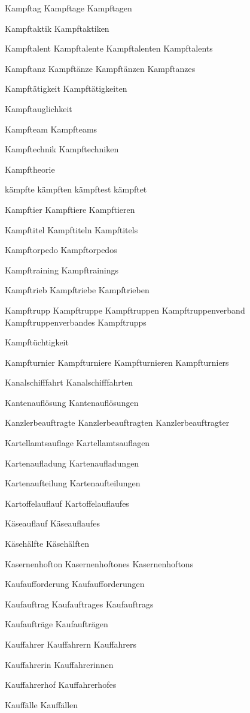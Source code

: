 Kampftag
Kampftage
Kampftagen

Kampftaktik
Kampftaktiken

Kampftalent
Kampftalente
Kampftalenten
Kampftalents

Kampftanz
Kampftänze
Kampftänzen
Kampftanzes

Kampftätigkeit
Kampftätigkeiten

Kampftauglichkeit


Kampfteam
Kampfteams

Kampftechnik
Kampftechniken

Kampftheorie

kämpfte
kämpften
kämpftest
kämpftet

Kampftier
Kampftiere
Kampftieren

Kampftitel
Kampftiteln
Kampftitels

Kampftorpedo
Kampftorpedos

Kampftraining
Kampftrainings

Kampftrieb
Kampftriebe
Kampftrieben

Kampftrupp
Kampftruppe
Kampftruppen
Kampftruppenverband
Kampftruppenverbandes
Kampftrupps

Kampftüchtigkeit

Kampfturnier
Kampfturniere
Kampfturnieren
Kampfturniers

Kanalschifffahrt
Kanalschifffahrten

Kantenauflösung
Kantenauflösungen

Kanzlerbeauftragte
Kanzlerbeauftragten
Kanzlerbeauftragter

Kartellamtsauflage
Kartellamtsauflagen

Kartenaufladung
Kartenaufladungen

Kartenaufteilung
Kartenaufteilungen

Kartoffelauflauf
Kartoffelauflaufes

Käseauflauf
Käseauflaufes

Käsehälfte
Käsehälften

Kasernenhofton
Kasernenhoftones
Kasernenhoftons

Kaufaufforderung
Kaufaufforderungen

Kaufauftrag
Kaufauftrages
Kaufauftrags

Kaufaufträge
Kaufaufträgen

Kauffahrer
Kauffahrern
Kauffahrers

Kauffahrerin
Kauffahrerinnen

Kauffahrerhof
Kauffahrerhofes

Kauffälle
Kauffällen


